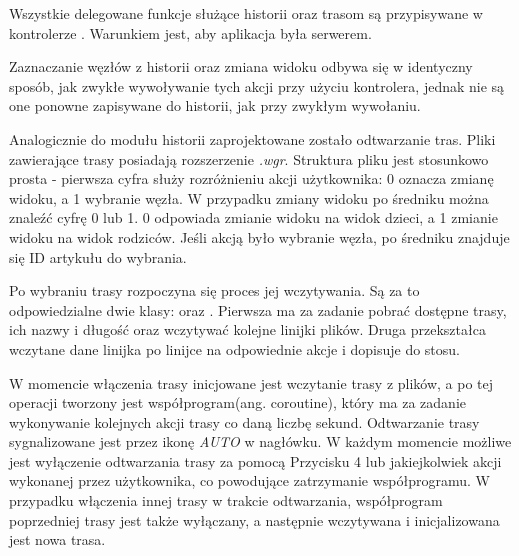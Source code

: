 Wszystkie delegowane funkcje służące historii oraz trasom są przypisywane w kontrolerze  . Warunkiem jest, aby aplikacja była serwerem.

Zaznaczanie węzłów z historii oraz zmiana widoku odbywa się w identyczny sposób, jak zwykłe wywoływanie tych akcji przy użyciu kontrolera, jednak nie są one ponowne zapisywane do historii, jak przy zwykłym wywołaniu.

Analogicznie do modułu historii zaprojektowane zostało odtwarzanie tras. Pliki zawierające trasy posiadają rozszerzenie \textit{.wgr}. Struktura pliku jest stosunkowo prosta - pierwsza cyfra służy rozróżnieniu akcji użytkownika: 0 oznacza zmianę widoku, a 1 wybranie węzła. W przypadku zmiany widoku po średniku można znaleźć cyfrę 0 lub 1. 0 odpowiada zmianie widoku na widok dzieci, a 1 zmianie widoku na widok rodziców. Jeśli akcją było wybranie węzła, po średniku znajduje się ID artykułu do wybrania. 



Po wybraniu trasy rozpoczyna się proces jej wczytywania. Są za to odpowiedzialne dwie klasy:   oraz  . Pierwsza ma za zadanie pobrać dostępne trasy, ich nazwy i długość oraz wczytywać kolejne linijki plików. Druga przekształca wczytane dane linijka po linijce na odpowiednie akcje i dopisuje do stosu.

W momencie włączenia trasy inicjowane jest wczytanie trasy z plików, a po tej operacji tworzony jest współprogram(ang. coroutine), który ma za zadanie wykonywanie kolejnych akcji trasy co daną liczbę sekund. Odtwarzanie trasy sygnalizowane jest przez ikonę \textit{AUTO} w nagłówku. W każdym momencie możliwe jest wyłączenie odtwarzania trasy za pomocą Przycisku 4 lub jakiejkolwiek akcji wykonanej przez użytkownika, co powodujące zatrzymanie współprogramu. W przypadku włączenia innej trasy w trakcie odtwarzania, współprogram poprzedniej trasy jest także wyłączany, a następnie wczytywana i inicjalizowana jest nowa trasa. 

